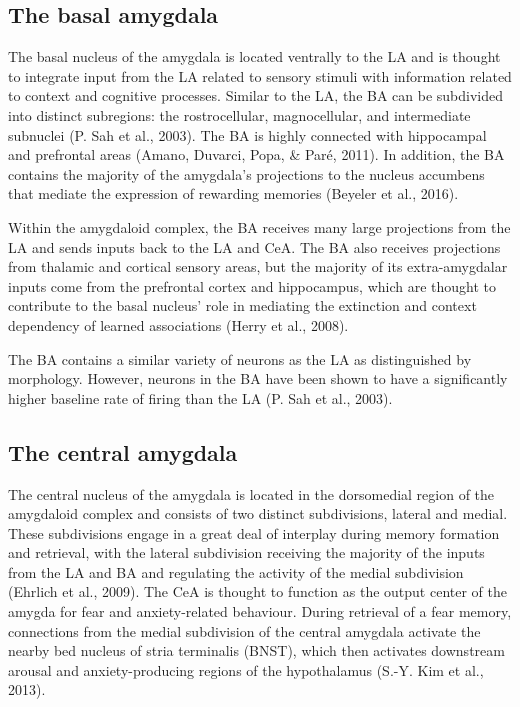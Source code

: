 \documentclass[12pt,a4paperpaper,]{report}
\begin{document}
\subsection{The basal amygdala}\label{the-basal-amygdala}

The basal nucleus of the amygdala is located ventrally to the LA and is
thought to integrate input from the LA related to sensory stimuli with
information related to context and cognitive processes. Similar to the
LA, the BA can be subdivided into distinct subregions: the
rostrocellular, magnocellular, and intermediate subnuclei (P. Sah et
al., 2003). The BA is highly connected with hippocampal and prefrontal
areas (Amano, Duvarci, Popa, \& Paré, 2011). In addition, the BA
contains the majority of the amygdala's projections to the nucleus
accumbens that mediate the expression of rewarding memories (Beyeler et
al., 2016).

Within the amygdaloid complex, the BA receives many large projections
from the LA and sends inputs back to the LA and CeA. The BA also
receives projections from thalamic and cortical sensory areas, but the
majority of its extra-amygdalar inputs come from the prefrontal cortex
and hippocampus, which are thought to contribute to the basal nucleus'
role in mediating the extinction and context dependency of learned
associations (Herry et al., 2008).

The BA contains a similar variety of neurons as the LA as distinguished
by morphology. However, neurons in the BA have been shown to have a
significantly higher baseline rate of firing than the LA (P. Sah et al.,
2003).

\subsection{The central amygdala}\label{the-central-amygdala}

The central nucleus of the amygdala is located in the dorsomedial region
of the amygdaloid complex and consists of two distinct subdivisions,
lateral and medial. These subdivisions engage in a great deal of
interplay during memory formation and retrieval, with the lateral
subdivision receiving the majority of the inputs from the LA and BA and
regulating the activity of the medial subdivision (Ehrlich et al.,
2009). The CeA is thought to function as the output center of the amygda
for fear and anxiety-related behaviour. During retrieval of a fear
memory, connections from the medial subdivision of the central amygdala
activate the nearby bed nucleus of stria terminalis (BNST), which then
activates downstream arousal and anxiety-producing regions of the
hypothalamus (S.-Y. Kim et al., 2013).
\end{document}
